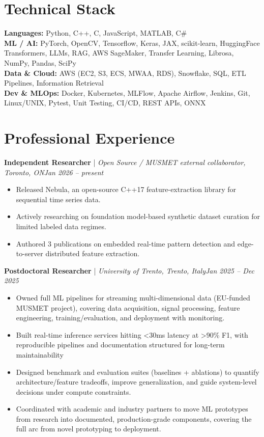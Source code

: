 \documentclass[11pt]{article}
\newenvironment{cvrole}[5]{%
  \par\noindent\textbf{\large #1} | \textit{\small #2, #3}\hfill \textit{\small #4 -- #5}\par
  \begin{itemize}[leftmargin=2em, itemsep=-0.3em, topsep=-0.5em]%
}{%
  \end{itemize}\par\noindent\mbox{}\par\vspace{0.1em}%
}
\begin{document}
\section*{Technical Stack}
\textbf{Languages:} Python, C++, C, JavaScript, MATLAB, C\#\\
\textbf{ML / AI:} PyTorch, OpenCV, Tensorflow, Keras, JAX, scikit-learn, HuggingFace Transformers, LLMs, RAG, AWS SageMaker, Transfer Learning, Librosa, NumPy, Pandas, SciPy\\
\textbf{Data \& Cloud:} AWS (EC2, S3, ECS, MWAA, RDS), Snowflake, SQL, ETL Pipelines, Information Retrieval\\
\textbf{Dev \& MLOps:} Docker, Kubernetes, MLFlow, Apache Airflow, Jenkins, Git, Linux/UNIX, Pytest, Unit Testing, CI/CD, REST APIs, ONNX

\section*{Professional Experience}
\begin{cvrole}{Independent Researcher}{Open Source / MUSMET external collaborator}{Toronto, ON}{Jan 2026}{present}
    \item Released Nebula, an open-source C++17 feature-extraction library for sequential time series data.
    \item Actively researching on foundation model-based synthetic dataset curation for limited labeled data regimes.
    \item Authored 3 publications on embedded real-time pattern detection and edge-to-server distributed feature extraction.
\end{cvrole}

\begin{cvrole}{Postdoctoral Researcher}{University of Trento}{Trento, Italy}{Jan 2025}{Dec 2025}
    \item Owned full ML pipelines for streaming multi-dimensional data (EU-funded MUSMET project), covering data acquisition, signal processing, feature engineering, training/evaluation, and deployment with monitoring.
    \item Built real-time inference services hitting <30ms latency at >90\% F1, with reproducible pipelines and documentation structured for long-term maintainability
    \item Designed benchmark and evaluation suites (baselines + ablations) to quantify architecture/feature tradeoffs, improve generalization, and guide system-level decisions under compute constraints.
    \item Coordinated with academic and industry partners to move ML prototypes from research into documented, production-grade components, covering the full arc from novel prototyping to deployment.
\end{cvrole}
\end{document}
